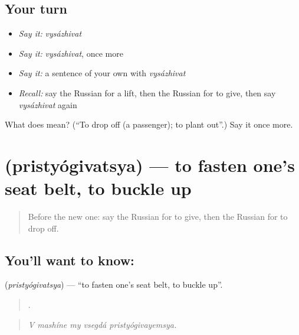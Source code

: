 \subsection*{Your turn}
\begin{itemize}
\raggedright
  \item \emph{Say it:} \emph{vysázhivat}
  \item \emph{Say it:} \emph{vysázhivat}, once more
  \item \emph{Say it:} a sentence of your own with \emph{vysázhivat}
  \item \emph{Recall:} say the Russian for a lift, then the Russian for to give, then say \emph{vysázhivat} again
\end{itemize}

\begin{tcolorbox}[breakable,colback=teal!4,colframe=teal!35!black,title={Before you move on}]
What does  mean? (\textquotedblleft{}To drop off (a passenger); to plant out\textquotedblright{}.) Say it once more.
\end{tcolorbox}
\section[\texorpdfstring{\ru{пристёгиваться} (pristyógivatsya)}{пристёгиваться (pristyógivatsya)}]{ (pristyógivatsya) — to fasten one's seat belt, to buckle up}

\label{lesson:RU-C411-pristyogivatsya}



\begin{quote}
Before the new one: say the Russian for to give, then the Russian for to drop off.
\end{quote}

\subsection*{You'll want to know: }
\textbf{} (\emph{pristyógivatsya}) — \textquotedblleft{}to fasten one's seat belt, to buckle up\textquotedblright{}.

\begin{quote}
    .
\end{quote}

\begin{quote}
\emph{V mashíne my vsegdá pristyógivayemsya.}
\end{quote}

